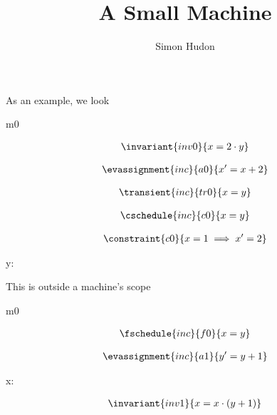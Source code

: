 \documentclass[12pt]{amsart}
\title{A Small Machine}
\author{Simon Hudon}
\date{} %
\begin{document}
\maketitle

As an example, we look

\begin{machine}{m0}


\begin{align*}
\invariant{inv0}
{	x = 2 \cdot y	}
\end{align*}

\begin{align*}
\evassignment{inc}{a0}
{	x' = x + 2	}
\end{align*}

\begin{align*}
\transient{inc}{tr0}
{	x = y	}
\end{align*}

\begin{align*}
\cschedule{inc}{c0}
{	x = y	}
\end{align*}

\begin{align*}
\constraint{c0}
{	x = 1 \implies x' = 2	}
\end{align*}

\begin{variable}
	y: \Int
\end{variable}

\end{machine}
This is outside a machine's scope

\begin{machine}{m0}

\begin{align*}
\fschedule{inc}{f0}
{	x = y	}
\end{align*}

\begin{align*}
\evassignment{inc}{a1}
{	y' = y + 1	}
\end{align*}

\begin{variable}
	x: \Int
\end{variable}

\begin{align*}
\invariant{inv1}
{	x = x \cdot (y + 1)	}
\end{align*}

\end{machine}
\end{document}
